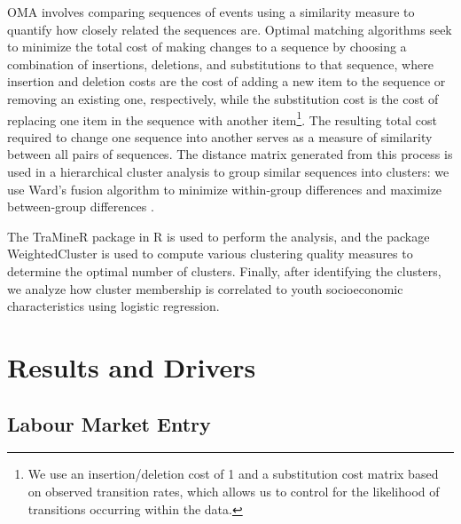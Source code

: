 \documentclass[
  a4paper, twoside, 12pt]{book}
\begin{document}
OMA involves comparing sequences of events using a similarity measure to quantify how closely related the sequences are. Optimal matching algorithms seek to minimize the total cost of making changes to a sequence by choosing a combination of insertions, deletions, and substitutions to that sequence, where insertion and deletion costs are the cost of adding a new item to the sequence or removing an existing one, respectively, while the substitution cost is the cost of replacing one item in the sequence with another item\footnote{We use an insertion/deletion cost of 1 and a substitution cost matrix based on observed transition rates, which allows us to control for the likelihood of transitions occurring within the data.}. The resulting total cost required to change one sequence into another serves as a measure of similarity between all pairs of sequences. The distance matrix generated from this process is used in a hierarchical cluster analysis to group similar sequences into clusters: we use Ward's fusion algorithm to minimize within-group differences and maximize between-group differences \autocite{dlouhy2015,achatz2022}.

The TraMineR package in R \autocite{gabadinho2011} is used to perform the analysis, and the package WeightedCluster \autocite{studer2013} is used to compute various clustering quality measures to determine the optimal number of clusters. Finally, after identifying the clusters, we analyze how cluster membership is correlated to youth socioeconomic characteristics using logistic regression.

\hypertarget{survey-results}{%
\section{Results and Drivers}\label{survey-results}}

\hypertarget{survey-entry}{%
\subsection{Labour Market Entry}\label{survey-entry}}

\begin{singlespacing}

\end{singlespacing}
\end{document}
